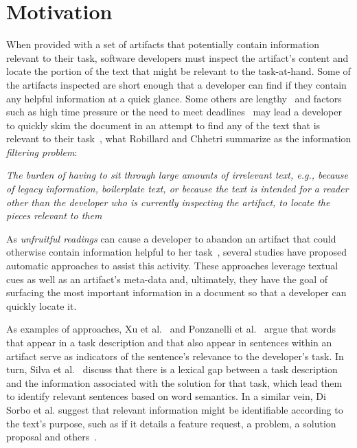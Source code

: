 \section{Motivation}
\label{cp5:motivation}


When provided with a set of artifacts that potentially contain information relevant to their task,
software developers must inspect the artifact's content and locate the portion of the text that might be relevant to the task-at-hand. 
Some of the artifacts inspected are short enough that a developer can find if they contain any helpful information at a quick glance.
Some others are lengthy~\cite{Rastkar2013t} and factors such
as high time pressure or
the need to meet deadlines~\cite{meyer2019}
may lead a developer to quickly skim the document
in an attempt to find any of the text that is relevant to their task~\cite{Starke2009},
what Robillard and Chhetri summarize as the information \textit{filtering problem}:

\smallskip
\begin{bluequote}
    \textit{The burden  of having to sit through large amounts of irrelevant text, e.g., because of legacy information, boilerplate text, or because the text is intended for a reader other than the developer who is currently inspecting the artifact, to locate the pieces relevant to them}~\cite{Robillard2015}
\end{bluequote}



As \textit{unfruitful readings} can 
cause a developer to abandon an artifact that could otherwise contain information  helpful to her task~\cite{Brandt2009a, Starke2009},
several studies have proposed automatic approaches to assist this activity. 
These approaches leverage textual cues as well as an artifact's meta-data and, ultimately, they have the goal of surfacing 
the most important information in a document so that a developer can quickly 
locate it.


As examples of approaches, Xu et al.~\cite{Xu2017} and Ponzanelli et al.~\cite{Ponzanelli2015}
argue that words that appear in a task description and that also appear in sentences within an artifact serve as indicators of the sentence's relevance to the developer's task.
In turn, Silva et al.~\cite{silva2019} discuss that 
there is a lexical gap between a task description and the information associated 
with the solution for that task, which lead them to identify
relevant sentences based on word semantics.
In a similar vein, Di Sorbo et al. suggest that relevant information might be identifiable 
according to the text's purpose, such as if it details a feature request, a problem, a solution proposal and others~\cite{Sorbo2015}.


